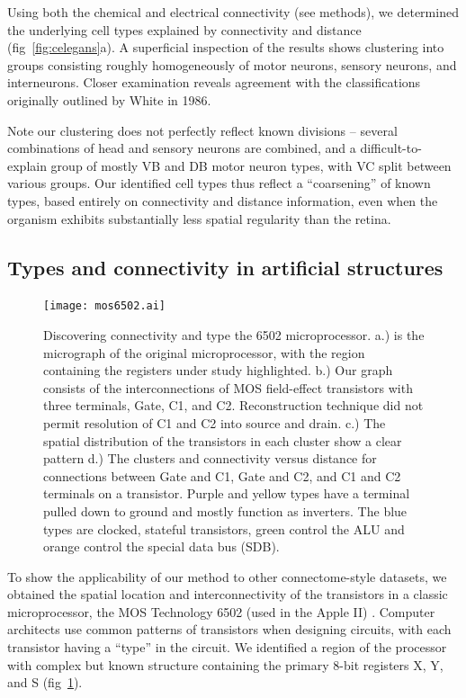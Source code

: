 \documentclass{article}
\begin{document}
Using both the chemical and electrical connectivity (see methods), we
determined the underlying cell types explained by connectivity and
distance (fig~\ref{fig:celegans}a). A superficial inspection of the
results shows clustering into groups consisting roughly homogeneously
of motor neurons, sensory neurons, and interneurons. Closer
examination reveals agreement with the classifications originally
outlined by White in 1986.

Note our clustering does not perfectly reflect known divisions --
several combinations of head and sensory neurons are combined, and a
difficult-to-explain group of mostly VB and DB motor neuron types,
with VC split between various groups. Our identified cell types thus
reflect a ``coarsening'' of known types, based entirely on
connectivity and distance information, even when the organism exhibits
substantially less spatial regularity than the retina.

\subsection*{Types and connectivity in artificial structures}
\begin{figure}
  \centering 
  \centerline{\texttt{[image: mos6502.ai]}}
  \caption{Discovering connectivity and type the 6502 microprocessor.
    a.) is the micrograph of the original microprocessor, with the
    region containing the registers under study highlighted. b.) Our
    graph consists of the interconnections of MOS field-effect
    transistors with three terminals, Gate, C1, and C2. Reconstruction
    technique did not permit resolution of C1 and C2 into source and
    drain. c.) The spatial distribution of the transistors in each
    cluster show a clear pattern d.) The clusters and connectivity
    versus distance for connections between Gate and C1, Gate and C2,
    and C1 and C2 terminals on a transistor. Purple and yellow types have a
    terminal pulled down to ground and mostly function as
    inverters. The blue types are clocked, stateful transistors, green
    control the ALU and orange control the special data bus (SDB).}
  \label{fig:mos6502}
\end{figure}


To show the applicability of our method to other connectome-style
datasets, we obtained the spatial location and interconnectivity of
the transistors in a classic microprocessor, the MOS Technology 6502
(used in the Apple II) \autocite{James2010}. Computer architects use
common patterns of transistors when designing circuits, with each
transistor having a ``type'' in the circuit. We identified a region of
the processor with complex but known structure containing the primary
8-bit registers X, Y, and S (fig~\ref{fig:mos6502}).
\end{document}
